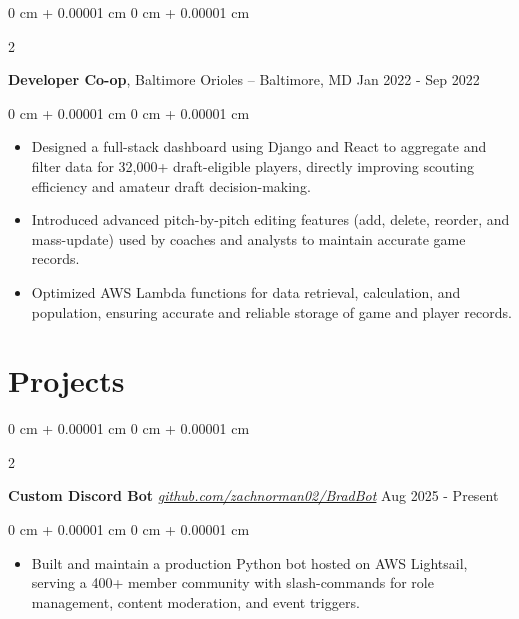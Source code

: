 \documentclass[12pt, letterpaper]{article}
\newenvironment{highlights}{
    \begin{itemize}[
        topsep=0.02 cm,
        parsep=0.05 cm,
        partopsep=0pt,
        itemsep=0pt,
        leftmargin=0 cm + 10pt
    ]
}{
    \end{itemize}
} %
\newenvironment{onecolentry}{
    \begin{adjustwidth}{
        0 cm + 0.00001 cm
    }{
        0 cm + 0.00001 cm
    }
}{
    \end{adjustwidth}
} %
\newenvironment{twocolentry}[2][]{
    \onecolentry
    \def\secondColumn{#2}
    \setcolumnwidth{\fill, 4.5 cm}
    \begin{paracol}{2}
}{
    \switchcolumn \raggedleft \secondColumn
    \end{paracol}
    \endonecolentry
} %
\let\hrefWithoutArrow\href
\begin{document}
    \vspace{0.05 cm}
    \begin{twocolentry}{
        Jan 2022 - Sep 2022
    }
    \textbf{Developer Co-op}, Baltimore Orioles -- Baltimore, MD \end{twocolentry}
    \vspace{0.05 cm}
    \begin{onecolentry}
      \begin{highlights}
        \item Designed a full-stack dashboard using Django and React to aggregate and filter data for 32,000+ draft-eligible players, directly improving scouting efficiency and amateur draft decision-making.
        \item Introduced advanced pitch-by-pitch editing features (add, delete, reorder, and mass-update) used by coaches and analysts to maintain accurate game records.
        \item Optimized AWS Lambda functions for data retrieval, calculation, and population, ensuring accurate and reliable storage of game and player records.
      \end{highlights}
    \end{onecolentry}

    \section{Projects}
    \vspace{0.06cm}
    \begin{twocolentry}{
        Aug 2025 - Present
    }
    \textbf{Custom Discord Bot} \hrefWithoutArrow{https://github.com/zachnorman02/BradBot}{\textcolor{linkGray}{\textit{github.com/zachnorman02/BradBot}}} \end{twocolentry}
    \vspace{0.05 cm}
    \begin{onecolentry}
      \begin{highlights}
        \item Built and maintain a production Python bot hosted on AWS Lightsail, serving a 400+ member community with slash-commands for role management, content moderation, and event triggers.
      \end{highlights}
    \end{onecolentry}
\end{document}
